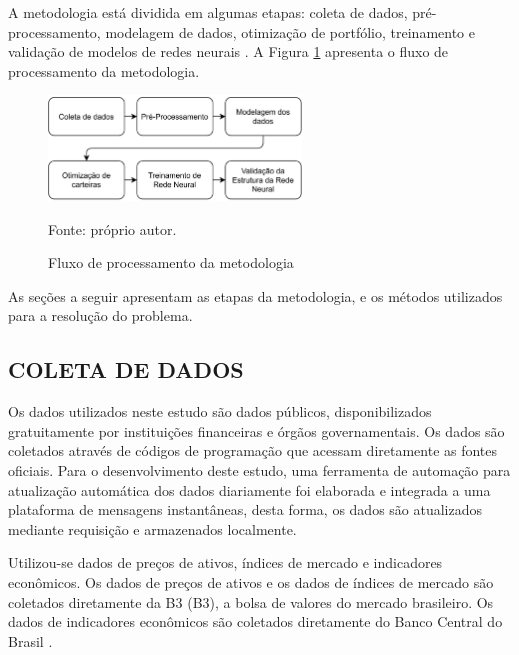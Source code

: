     \ipar A metodologia está dividida em algumas etapas: coleta de dados, pré-processamento, modelagem de dados, otimização de portfólio, treinamento e validação de modelos de redes neurais . A Figura \ref{fig:fluxo_metodologia} apresenta o fluxo de processamento da metodologia.

    \begin{figure}[H]
        \centering
        \caption{Fluxo de processamento da metodologia}
        \label{fig:fluxo_metodologia}
        \includegraphics[width=0.6\textwidth]{imagens/fluxo_metodologia.png}
        \par \footnotesize Fonte: próprio autor.
    \end{figure}

    \ipar As seções a seguir apresentam as etapas da metodologia, e os métodos utilizados para a resolução do problema.

    \subsection{COLETA DE DADOS}

        \ipar Os dados utilizados neste estudo são dados públicos, disponibilizados gratuitamente por instituições financeiras e órgãos governamentais. Os dados são coletados através de códigos de programação que acessam diretamente as fontes oficiais. Para o desenvolvimento deste estudo, uma ferramenta de automação para atualização automática dos dados diariamente foi elaborada e integrada a uma plataforma de mensagens instantâneas, desta forma, os dados são atualizados mediante requisição e armazenados localmente.

        \ipar Utilizou-se dados de preços de ativos, índices de mercado e indicadores econômicos. Os dados de preços de ativos e os dados de índices de mercado são coletados diretamente da \acrshort{B3} (\acrlong{B3}), a bolsa de valores do mercado brasileiro. Os dados de indicadores econômicos são coletados diretamente do Banco Central do Brasil \cite{bcb2023selic}.
        
